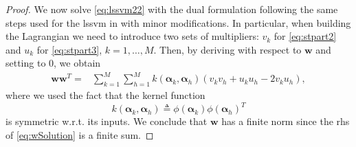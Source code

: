 \documentclass[draftcls,onecolumn,12pt]{IEEEtran}
\newcommand{\wrt}{w.r.t. }
\begin{document}
\begin{proof}
	We now solve \eqref{eq:lssvm22} with the dual formulation following the same steps used for the \ac{lssvm} in \cite{Suykens1999} with minor modifications. In particular, when building the Lagrangian we need to introduce two sets of multipliers: $v_k$ for \eqref{eq:stpart2} and $u_k$ for \eqref{eq:stpart3}, $k=1,\dots, M$. Then, by deriving with respect to $\mathbf{w}$ and setting to 0, we obtain 
	\begin{equation}
	\label{eq:wSolution}
	\begin{aligned}
	\mathbf{w}\mathbf{w}^T =&  \sum_{k=1}^{M} \sum_{h=1}^{M} k(\bm{\alpha}_k,\bm{\alpha}_h) (v_kv_h + u_ku_h -2 v_ku_h),
	\end{aligned}
	\end{equation}
	where we used the fact that the kernel function
	\begin{equation}
	k(\bm{\alpha}_k,\bm{\alpha}_h) \triangleq \phi(\bm{\alpha}_k) \phi(\bm{\alpha}_h)^T
	\end{equation} is symmetric \wrt its inputs. We conclude that $\mathbf{w}$ has a finite norm since the rhs of \eqref{eq:wSolution} is a finite sum.
	
\end{proof}
\end{document}
